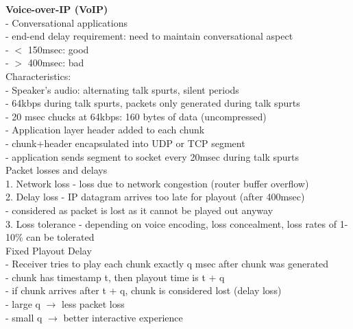 \documentclass[10pt, a4paper]{article}
\newcommand{\blue}[1]{{\color{MidnightBlue}#1}}
\newcommand{\red}[1]{{\color{red}#1}}
\newcommand{\tab}[0]{\hspace*{2mm}}
\begin{document}
\begin{multicols*}{3}
		\textbf{Voice-over-IP (VoIP)}\\
		- Conversational applications\\
		- \red{end-end delay requirement}: need to maintain conversational aspect\\
		\tab - $<$ 150msec: good\\
		\tab - $>$ 400msec: bad\\

		Characteristics:\\
		- Speaker's audio: alternating talk spurts, silent periods\\
		\tab - \blue{64kbps} during talk spurts, packets \red{only generated during talk spurts}\\
		\tab - 20 msec chucks at 64kbps: 160 bytes of data (uncompressed)\\
		- Application layer header added to each chunk\\
		- chunk+header encapsulated into UDP or TCP segment\\
		- application sends segment to socket every 20msec during talk spurts\\

		Packet losses and delays\\
		1. \red{Network loss} - loss due to network congestion (router buffer overflow)\\
		2. \red{Delay loss} - IP datagram arrives \red{too late} for playout (after 400msec)\\
		\tab - considered as packet is lost as it cannot be played out anyway\\
		3. \red{Loss tolerance} - depending on \blue{voice encoding}, \blue{loss concealment}, loss rates of 1-10\% can be tolerated\\

		Fixed Playout Delay\\
		- Receiver tries to play each chunk exactly \blue{q} msec after chunk \red{was generated}\\
		\tab - chunk has timestamp \blue{t}, then playout time is \blue{t + q}\\
		\tab - if chunk arrives \red{after} \blue{t + q}, chunk is considered lost (delay loss)\\
		- \blue{large q} $\rightarrow$ less packet loss\\
		- \blue{small q} $\rightarrow$ better interactive experience\\


\end{multicols*}
\end{document}
